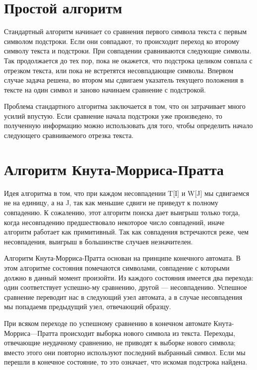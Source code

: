 \documentclass[a4paper,14pt]{report}
\begin{document}
\section*{Простой алгоритм}

Стандартный  алгоритм  начинает  со  сравнения первого символа текста с первым  символом подстроки.  Если  они совпадают,   то  происходит  переход  ко  второму  символу  текста  и  подстроки.
При  совпадении  сравниваются  следующие  символы.    Так  продолжается  до  тех  пор,  пока не окажется,  что подстрока целиком  совпала с  отрезком  текста,  или пока не  встретятся  несовпадающие  символы.  Впервом  случае  задача  решена,  во  втором  мы  сдвигаем  указатель  текущего  положения  в  тексте  на один  символ  и  заново  начинаем  сравнение с  подстрокой.

Проблема  стандартного  алгоритма  заключается  в  том,  что  он  затрачивает много усилий впустую.  Если сравнение начала подстроки уже произведено, то полученную информацию можно использовать для того,  чтобы определить  начало  следующего  сравниваемого  отрезка  текста.

\section*{Алгоритм Кнута-Морриса-Пратта}

Идея алгоритма в том, что при каждом несовпадении T[I] и W[J] мы сдвигаемся не на единицу, а на J, так как меньшие сдвиги не приведут к полному совпадению. К сожалению, этот алгоритм поиска дает выигрыш только тогда, когда несовпадению предшествовало некоторое число совпадений, иначе алгоритм работает как примитивный. Так как совпадения встречаются реже, чем несовпадения, выигрыш в большинстве случаев незначителен.

Алгоритм  Кнута-Морриса-Пратта  основан  на  принципе  конечного автомата.     В  этом  алгоритме  состояния  помечаются  символами,  совпадение  с  которыми  должно  в  данный  момент  произойти.  Из каждого  состояния  имеется  два перехода:  один соответствует  успешно-му сравнению,  другой — несовпадению.
Успешное сравнение переводит нас  в  следующий  узел  автомата,  а  в  случае  несовпадения  мы  попадаемв  предыдущий  узел,   отвечающий  образцу.

При  всяком  переходе  по  успешному  сравнению  в  конечном  автомате Кнута-Морриса—Пратта  происходит  выборка  нового  символа  из  текста.   Переходы,  отвечающие  неудачному  сравнению,  не  приводят  к  выборке  нового  символа;  вместо  этого  они  повторно  используют  последний выбранный  символ.  Если  мы перешли  в  конечное состояние,  то это означает,  что  искомая  подстрока  найдена.
\end{document}

